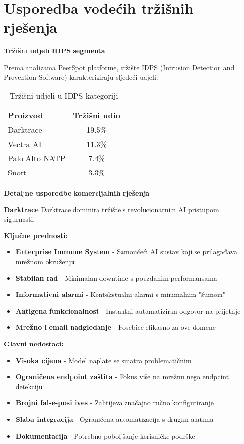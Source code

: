 \chapter{Usporedba vodećih tržišnih rješenja}

\textbf{Tržišni udjeli IDPS segmenta}

Prema analizama PeerSpot platforme, tržište IDPS (Intrusion Detection and Prevention Software) karakteriziraju sljedeći udjeli:

\begin{table}[h]
\centering
\begin{tabular}{|l|c|}
\hline
\textbf{Proizvod} & \textbf{Tržišni udio} \\
\hline
Darktrace & 19.5\% \\
\hline
Vectra AI & 11.3\% \\
\hline
Palo Alto NATP & 7.4\% \\
\hline
Snort & 3.3\% \\
\hline
\end{tabular}
\caption{Tržišni udjeli u IDPS kategoriji}
\end{table}

\textbf{Detaljne usporedbe komercijalnih rješenja}

\textbf{Darktrace}
Darktrace dominira tržište s revolucionarnim AI pristupom sigurnosti.

\textbf{Ključne prednosti:}
\begin{itemize}
\item \textbf{Enterprise Immune System} - Samoučeći AI sustav koji se prilagođava mrežnom okruženju
\item \textbf{Stabilan rad} - Minimalan downtime s pouzdanim performansama
\item \textbf{Informativni alarmi} - Kontekstualni alarmi s minimalnim "šumom"
\item \textbf{Antigena funkcionalnost} - Instantni automatiziran odgovor na prijetnje
\item \textbf{Mrežno i email nadgledanje} - Posebice efikasno za ove domene
\end{itemize}

\textbf{Glavni nedostaci:}
\begin{itemize}
\item \textbf{Visoka cijena} - Model naplate se smatra problematičnim
\item \textbf{Ograničena endpoint zaštita} - Fokus više na mrežnu nego endpoint detekciju
\item \textbf{Brojni false-positives} - Zahtijeva značajno ručno konfiguriranje
\item \textbf{Slaba integracija} - Ograničena automatizacija s drugim alatima
\item \textbf{Dokumentacija} - Potrebno poboljšanje korisničke podrške
\end{itemize}

